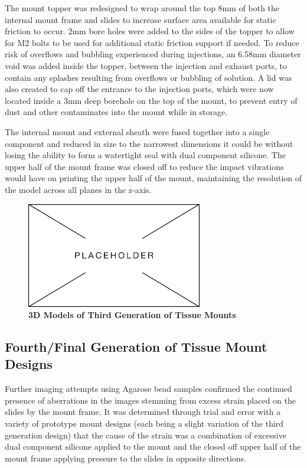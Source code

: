 The mount topper was redesigned to wrap around the top 8mm of both the internal mount frame and slides to increase surface area available for static friction to occur. 2mm bore holes were added to the sides of the topper to allow for M2 bolts to be used for additional static friction support if needed. To reduce risk of overflows and bubbling experienced during injections, an 6.58mm diameter void was added inside the topper, between the injection and exhaust ports, to contain any splashes resulting from overflows or bubbling of solution. A lid was also created to cap off the entrance to the injection ports, which were now located inside a 3mm deep borehole on the top of the mount, to prevent entry of dust and other contaminates into the mount while in storage.   

The internal mount and external sheath were fused together into a single component and reduced in size to the narrowest dimensions it could be without losing the ability to form a watertight seal with dual component silicone. The upper half of the mount frame was closed off to reduce the impact vibrations would have on printing the upper half of the mount, maintaining the resolution of the model across all planes in the z-axis. 


\begin{figure}[H]
        \centering
        \includegraphics[width=1\linewidth]{Figures/Placeholder.png}
        \caption{\textbf{3D Models of Third Generation of Tissue Mounts}}
        \label{fig:enter-label}
    \end{figure}

    
\subsection{Fourth/Final Generation of Tissue Mount Designs}
Further imaging attempts using Agarose bead samples confirmed the continued presence of aberrations in the images stemming from excess strain placed on the slides by the mount frame. It was determined through trial and error with a variety of prototype mount designs (each being a slight variation of the third generation design) that the cause of the strain was a combination of excessive dual component silicone applied to the mount and the closed off upper half of the mount frame applying pressure to the slides in opposite directions. 

